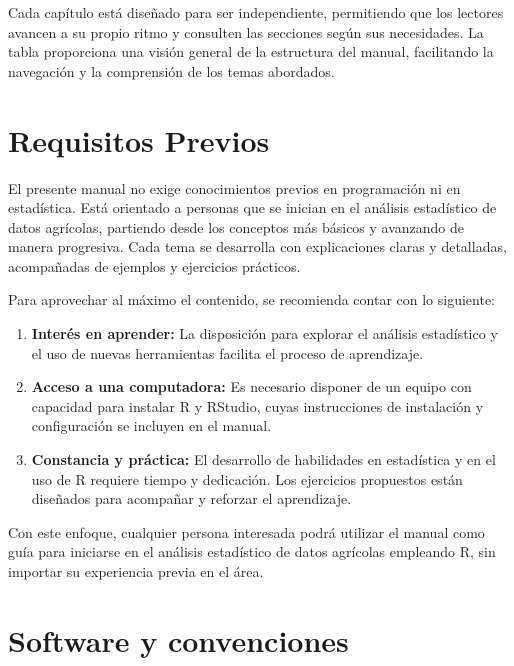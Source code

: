 \documentclass[
  spanish,
  letterpaper,
]{book}
\begin{document}
Cada capítulo está diseñado para ser independiente, permitiendo que los
lectores avancen a su propio ritmo y consulten las secciones según sus
necesidades. La tabla proporciona una visión general de la estructura
del manual, facilitando la navegación y la comprensión de los temas
abordados.

\section*{Requisitos Previos}\label{requisitos-previos}


El presente manual no exige conocimientos previos en programación ni en
estadística. Está orientado a personas que se inician en el análisis
estadístico de datos agrícolas, partiendo desde los conceptos más
básicos y avanzando de manera progresiva. Cada tema se desarrolla con
explicaciones claras y detalladas, acompañadas de ejemplos y ejercicios
prácticos.

Para aprovechar al máximo el contenido, se recomienda contar con lo
siguiente:

\begin{enumerate}
\def\labelenumi{\arabic{enumi}.}
\item
  \textbf{Interés en aprender:} La disposición para explorar el análisis
  estadístico y el uso de nuevas herramientas facilita el proceso de
  aprendizaje.
\item
  \textbf{Acceso a una computadora:} Es necesario disponer de un equipo
  con capacidad para instalar R y RStudio, cuyas instrucciones de
  instalación y configuración se incluyen en el manual.
\item
  \textbf{Constancia y práctica:} El desarrollo de habilidades en
  estadística y en el uso de R requiere tiempo y dedicación. Los
  ejercicios propuestos están diseñados para acompañar y reforzar el
  aprendizaje.
\end{enumerate}

Con este enfoque, cualquier persona interesada podrá utilizar el manual
como guía para iniciarse en el análisis estadístico de datos agrícolas
empleando R, sin importar su experiencia previa en el área.

\section*{Software y convenciones}\label{software-y-convenciones}
\end{document}
